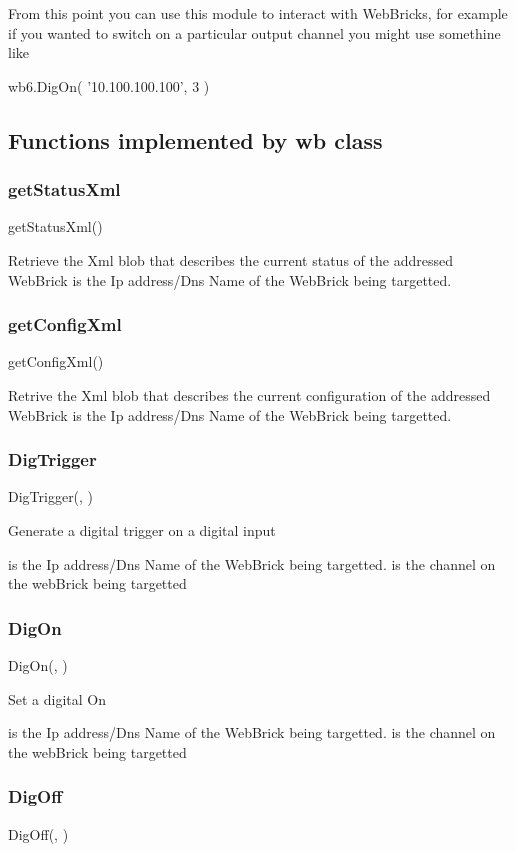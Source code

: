 From this point you can use this module to interact with WebBricks, for example
if you wanted to switch on a particular output channel you might use
somethine like

wb6.DigOn( '10.100.100.100', 3 )

\subsection{Functions implemented by wb class}

\subsubsection{getStatusXml}
getStatusXml()

Retrieve the Xml blob that describes the current status of the addressed WebBrick
     is the Ip address/Dns Name of the WebBrick being targetted.

\subsubsection{getConfigXml}
getConfigXml()

Retrive the Xml blob that describes the current configuration of the addressed WebBrick
 is the Ip address/Dns Name of the WebBrick being targetted.

\subsubsection{DigTrigger}
DigTrigger(, ) 

Generate a digital trigger on a digital input

     is the Ip address/Dns Name of the WebBrick being targetted.
     is the channel on the webBrick being targetted

\subsubsection{DigOn}
DigOn(, )

Set a digital On

     is the Ip address/Dns Name of the WebBrick being targetted.
     is the channel on the webBrick being targetted

\subsubsection{DigOff}
DigOff(, )

